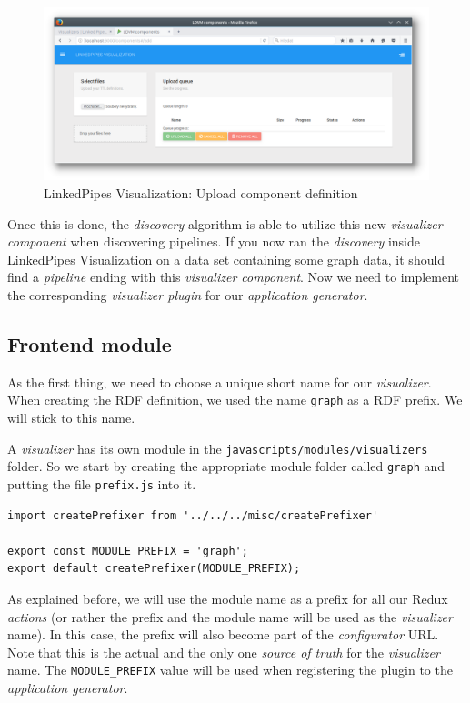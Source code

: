 \begin{figure}
	\centering
	\includegraphics[width=145mm]{img/05_upload_component_definition.png}
	\caption{LinkedPipes Visualization: Upload component definition}
    \label{fig:upload_component_definition}
\end{figure}

Once this is done, the \emph{discovery} algorithm is able to utilize this new \emph{visualizer component} when discovering pipelines. If you now ran the \emph{discovery} inside LinkedPipes Visualization on a data set containing some graph data, it should find a \emph{pipeline} ending with this \emph{visualizer component}. Now we need to implement the corresponding \emph{visualizer plugin} for our \emph{application generator}.

\subsection{Frontend module}

As the first thing, we need to choose a unique short name for our \emph{visualizer}. When creating the RDF definition, we used the name \texttt{graph} as a RDF prefix. We will stick to this name.

A \emph{visualizer} has its own module in the \texttt{javascripts/modules/visualizers} folder. So we start by creating the appropriate module folder called \texttt{graph} and putting the file \texttt{prefix.js} into it.

\begin{verbatim}
import createPrefixer from '../../../misc/createPrefixer'

export const MODULE_PREFIX = 'graph';
export default createPrefixer(MODULE_PREFIX);
\end{verbatim}

As explained before, we will use the module name as a prefix for all our Redux \emph{actions} (or rather the prefix and the module name will be used as the \emph{visualizer} name). In this case, the prefix will also become part of the \emph{configurator} URL. Note that this is the actual and the only one \emph{source of truth} for the \emph{visualizer} name. The \texttt{MODULE\_PREFIX} value will be used when registering the plugin to the \emph{application generator}.

